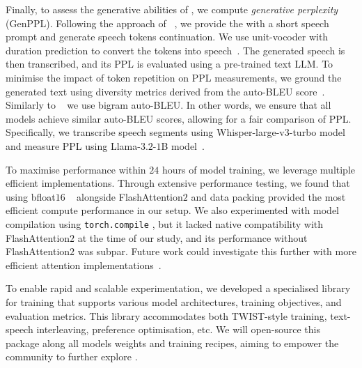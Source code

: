 Finally, to assess the generative abilities of \slms, we compute \emph{generative perplexity} (GenPPL). Following the approach of ~\cite{gslm, twist}, we provide the \slm with a short speech prompt and generate speech tokens continuation. We use unit-vocoder with duration prediction to convert the tokens into speech~\citep{polyak2021speech, twist}. The generated speech is then transcribed, and its \ac{PPL} is evaluated using a pre-trained text \ac{LLM}. To minimise the impact of token repetition on \ac{PPL} measurements, we ground the generated text using diversity metrics derived from the auto-BLEU score~\citep{gslm}. Similarly to ~\citet{lin2024alignslm} we use bigram auto-BLEU. In other words, we ensure that all models achieve similar auto-BLEU scores, allowing for a fair comparison of \ac{PPL}. Specifically, we transcribe speech segments using Whisper-large-v$3$-turbo model~\citep{radford2023robust} and measure \ac{PPL} using Llama-$3.2$-$1$B model~\citep{grattafiori2024llama3herdmodels}. 

 To maximise performance within $24$ hours of model training, we leverage multiple efficient implementations. Through extensive performance testing, we found that using bfloat$16$ ~\cite{kalamkar2019study} alongside FlashAttention$2$ \citep{dao2023flashattention2fasterattentionbetter} and data packing provided the most efficient compute performance in our setup. We also experimented with model compilation using \texttt{torch.compile} \citep{ansel2024pytorch}, but it lacked native compatibility with FlashAttention$2$ at the time of our study, and its performance without FlashAttention$2$ was subpar. Future work could investigate this further with more efficient attention implementations~\cite{FA3, li2024flexattention}.

To enable rapid and scalable experimentation, we developed a specialised library for \slm training that supports various model architectures, training objectives, and evaluation metrics. This library accommodates both TWIST-style training, text-speech interleaving, preference optimisation, etc. We will open-source this package along all models weights and training recipes, aiming to empower the community to further explore \slms.